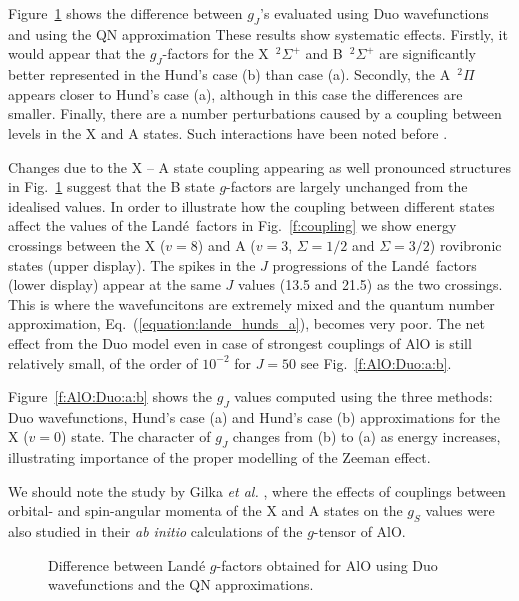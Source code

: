 \documentclass[preprint,review,12pt]{elsarticle}
\newcommand{\2}{$_{2}$}
\newcommand{\3}{$_{3}$}
\newcommand{\4}{$_{4}$}
\newcommand{\8}{$^{18}$}
\newcommand{\6}{$^{16}$}
\newcommand{\7}{$^{17}$}
\newcommand{\lande}{Land\'e}
\begin{document}
Figure~\ref{fig:AlO} shows the difference between $g_J$'s evaluated
using {\sc Duo} wavefunctions and using the QN approximation These
results show systematic effects. Firstly, it would appear that the
$g_J$-factors for
the   X~$^2\Sigma^+$ and  B~$^2\Sigma^+$ are significantly better
represented in the Hund's case (b) than case (a). Secondly, the
A~$^2\Pi$ appears closer to  Hund's case (a), although in this case
the differences are smaller. Finally,
there are a number
perturbations caused by a coupling between levels in the X and A states.
Such interactions have been noted before \cite{jt624}.

Changes due to  the X -- A state coupling
appearing as well pronounced structures in Fig.~\ref{fig:AlO} suggest
that the B state $g$-factors are largely unchanged from the idealised
values. In order to illustrate how the coupling between different
states affect the values of the \lande\ factors in
Fig.~\ref{f:coupling} we show energy crossings between the X ($v=8$)
and A ($v=3$, $\Sigma = 1/2$ and $\Sigma = 3/2$) rovibronic states
(upper display). The spikes in the $J$ progressions of the \lande\
factors (lower display) appear at the same $J$ values (13.5 and 21.5)
as the two crossings.  This is where the wavefuncitons are extremely
mixed and the quantum number approximation,
Eq.~(\ref{equation:lande_hunds_a}), becomes very poor.
The net effect   from the {\sc Duo} model even in case of strongest couplings of AlO
is still relatively small, of the order of $10^{-2}$ for $J=50$
see Fig.~\ref{f:AlO:Duo:a:b}.

Figure~\ref{f:AlO:Duo:a:b} shows the $g_J$ values computed using the
three methods: Duo wavefunctions, Hund's case (a) and Hund's case (b)
approximations for the X ($v=0$) state. The character of $g_J$ changes
from (b) to (a) as energy increases, illustrating importance of the
proper modelling of the Zeeman effect.

We should note the study by Gilka {\it et al.} \cite{08GiTaMa.AlO}, where the effects of couplings between orbital-
and spin-angular momenta of the X and A states on the $g_S$ values were also studied in their {\it ab initio}
calculations of the $g$-tensor of AlO.

\begin{figure}[htbp]
		\centering
{}
\caption{Difference between Land\'e $g$-factors obtained for AlO using {\sc Duo} wavefunctions and the QN
approximations.}
\label{fig:AlO}
\end{figure}
\end{document}
